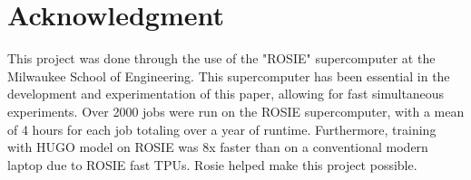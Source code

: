 \documentclass[conference]{IEEEtran}
\begin{document}



\section*{Acknowledgment}
This project was done through the use of the "ROSIE" supercomputer at the Milwaukee School of Engineering.
This supercomputer has been essential in the development and experimentation of this paper, allowing for fast simultaneous experiments. Over 2000 jobs were run on the ROSIE supercomputer, with a mean of 4 hours for each job totaling over a year of runtime. Furthermore, training with HUGO model on ROSIE was 8x faster than on a conventional modern laptop due to ROSIE fast TPUs. Rosie helped make this project possible.





\end{document}
